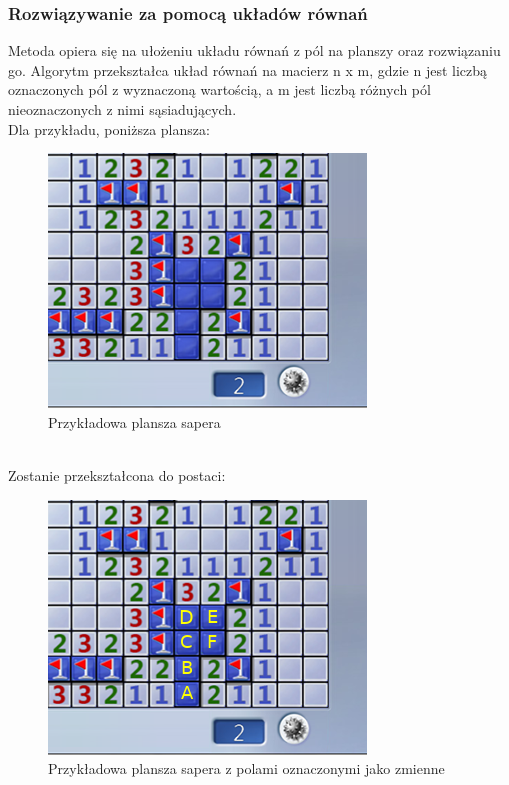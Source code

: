 \documentclass[letterpaper,12pt]{article}
\begin{document}
\subsubsection*{Rozwiązywanie za pomocą układów równań}
Metoda opiera się na ułożeniu układu równań z pól na planszy oraz rozwiązaniu go. 
Algorytm przekształca układ równań na macierz n x m, gdzie n jest liczbą oznaczonych 
pól z wyznaczoną wartością, a m jest liczbą różnych pól nieoznaczonych z nimi sąsiadujących.\\
\newpage
Dla przykładu, poniższa plansza:\\
\begin{figure}[h]
    \centering
    \includegraphics[scale=0.65]{matrix_first.png}
    \caption{Przykładowa plansza sapera}
\end{figure} \\
Zostanie przekształcona do postaci:\\
\begin{figure}[h]
    \centering
    \includegraphics[scale=0.5]{matrix_marked.png}
    \caption{Przykładowa plansza sapera z polami oznaczonymi jako zmienne}
\end{figure} \\
\end{document}
